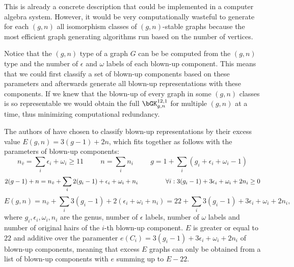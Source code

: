 This is already a concrete description that could be implemented in a computer algebra system. However, it would be very computationally wasteful to generate for each $(g,n)$ all isomorphism classes of $(g,n)$-stable graphs because the most efficient graph generating algorithms run based on the number of vertices.

Notice that the $(g,n)$ type of a graph $G$ can be be computed from the $(g,n)$ type and the number of $\epsilon$ and $\omega$ labels of each blown-up component. This means that we could first classify a set of blown-up components based on these parameters and afterwards generate all blown-up representations with these components. If we knew that the blown-up of every graph in some $(g,n)$ classes is so representable we would obtain the full $\bGK_{g,n}^{12,1}$ for multiple $(g,n)$ at a time, thus minimizing computational redundancy.

The authors of \cite[Section 3.2]{CLPW2} have chosen to classify blown-up representations by their excess value $E(g,n) = 3(g-1)+2n$, which fits together as follows with the parameters of blown-up components:
\[ n_{\bar{v}} = \sum_i\epsilon_i+\omega_i \geq 11 \hspace{1cm} n = \sum_i n_i \hspace{1cm} g = 1+\sum_i(g_i+\epsilon_i+\omega_i-1) \]
\[ 2(g-1)+n = n_{\bar{v}}+\sum_i 2(g_i-1)+\epsilon_i+\omega_i+n_i \hspace{1.5cm}  \forall i: 3(g_i-1)+3\epsilon_i+\omega_i+2n_i \geq 0\]
\[ E(g,n)= n_{\bar{v}}+\sum_i 3(g_i-1)+2(\epsilon_i+\omega_i+n_i) = 22+\sum_i 3(g_i-1)+3\epsilon_i+\omega_i+2n_i,
\]
where $g_i,\epsilon_i,\omega_i,n_i$ are the genus, number of $\epsilon$ labels, number of $\omega$ labels and number of original hairs of the $i$-th blown-up component. $E$ is greater or equal to $22$ and additive over the paramenter $e(C_i)=3(g_i-1)+3\epsilon_i+\omega_i+2n_i$ of blown-up components, meaning that excess $E$ graphs can only be obtained from a list of blown-up components with $e$ summing up to $E-22$.

